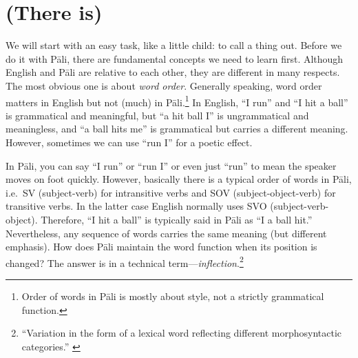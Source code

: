 \chapter{(There is) }\label{chap:nom}

We will start with an easy task, like a little child: to call a thing out. Before we do it with P\=ali, there are fundamental concepts we need to learn first. Although English and P\=ali are relative to each other, they are different in many respects. The most obvious one is about \emph{word order}. Generally speaking, word order matters in English but not (much) in P\=ali.\footnote{Order of words in P\=ali is mostly about style, not a strictly grammatical function.} In English, ``I run'' and ``I hit a ball'' is grammatical and meaningful, but ``a hit ball I'' is ungrammatical and meaningless, and ``a ball hits me'' is grammatical but carries a different meaning. However, sometimes we can use ``run I'' for a poetic effect.

In P\=ali, you can say ``I run'' or ``run I'' or even just ``run'' to mean the speaker moves on foot quickly. However, basically there is a typical order of words in P\=ali, i.e.\ SV (subject-verb) for intransitive verbs and SOV (subject-object-verb) for transitive verbs. In the latter case English normally uses SVO (subject-verb-object). Therefore, ``I hit a ball'' is typically said in P\=ali as ``I a ball hit.'' Nevertheless, any sequence of words carries the same meaning (but different emphasis). How does P\=ali maintain the word function when its position is changed? The answer is in a technical term---\emph{inflection}.\footnote{``Variation in the form of a lexical word reflecting different morphosyntactic categories.'' \citep[p.~227]{brownmiller:dict}}

